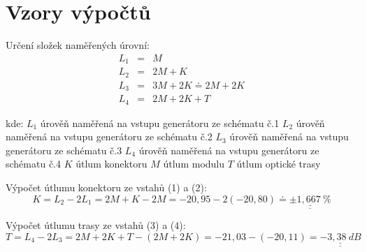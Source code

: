 \section*{Vzory výpočtů}
  
  \indent\indent Určení složek naměřených úrovní:  
	\begin{eqnarray}
		L_1 &=& M \\
		L_2 &=& 2M + K \\
		L_3 &=& 3M + 2K \doteq 2M + 2K\\
		L_4 &=& 2M + 2K + T  
	\end{eqnarray}
	
	\hspace*{2cm}kde:\newline    
  	\hspace*{4cm}$L_1$ \dotfill úrověň naměřená na vstupu generátoru ze schématu č.1\hspace*{4cm}\newline
  	\hspace*{4cm}$L_2$ \dotfill úrověň naměřená na vstupu generátoru ze schématu č.2\hspace*{4cm}\newline
  	\hspace*{4cm}$L_3$ \dotfill úrověň naměřená na vstupu generátoru ze schématu č.3\hspace*{4cm}\newline
  	\hspace*{4cm}$L_4$ \dotfill úrověň naměřená na vstupu generátoru ze schématu č.4\hspace*{4cm}\newline
  	\hspace*{4cm}$K$ \dotfill útlum konektoru\hspace*{4cm}\newline
  	\hspace*{4cm}$M$ \dotfill útlum modulu\hspace*{4cm}\newline
  	\hspace*{4cm}$T$ \dotfill útlum optické trasy\hspace*{4cm}\newline
  
 
  
  
  Výpočet útlumu konektoru ze vstahů (1) a (2):
  \begin{equation}
  	K = L_2 - 2L_1 = 2M + K - 2M = -20,95 -2(-20,80)\doteq \underline{\underline{\pm 1,667~\%}}
    \nonumber
  \end{equation}
  
  Výpočet útlumu trasy ze vstahů (3) a (4):
	\begin{equation}
  	T = L_4 - 2L_3 = 2M + 2K + T - (2M + 2K) = -21,03 -(-20,11) = \underline{\underline{-3,38~dB}}
    \nonumber
  \end{equation}

